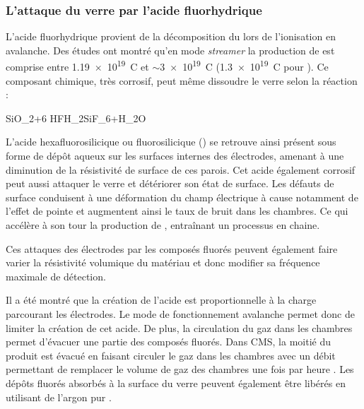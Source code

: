 \subsubsection{L'attaque du verre par l'acide fluorhydrique \texorpdfstring{}{HF}}
L'acide fluorhydrique  provient de la décomposition du  lors de l'ionisation en avalanche. Des études ont montré qu'en mode \textit{streamer} la production de  est comprise entre \num{1.19e19}\si{\per\coulomb} \cite{Lu:2009zzd} et $\sim$\num{3e19}\si{\per\coulomb} \cite{Abbrescia:2006hk} (\num{1.3e19}\si{\per\coulomb} pour \cite{Aielli:2006ih}). Ce composant chimique, très corrosif, peut même dissoudre le verre selon la réaction :
\begin{chemeqn}
SiO_2+6 HF\longrightarrow H_2SiF_6+H_2O
\end{chemeqn}
L'acide hexafluorosilicique ou fluorosilicique () se retrouve ainsi présent sous forme de dépôt aqueux sur les surfaces internes des électrodes, amenant à une diminution de la résistivité de surface de ces parois. Cet acide également corrosif peut aussi attaquer le verre et détériorer son état de surface. Les défauts de surface conduisent à une déformation du champ électrique à cause notamment de l'effet de pointe et augmentent ainsi le taux de bruit dans les chambres. Ce qui accélère à son tour la production de , entraînant un processus en chaine.

Ces attaques des électrodes par les composés fluorés peuvent également faire varier la résistivité volumique du matériau et donc modifier sa fréquence maximale de détection.

Il a été montré que la création de l'acide  est proportionnelle à la charge parcourant les électrodes. Le mode de fonctionnement avalanche permet donc de limiter la création de cet acide. De plus, la circulation du gaz dans les chambres permet d'évacuer une partie des composés fluorés. Dans CMS, la moitié du  produit est évacué en faisant circuler le gaz dans les chambres avec un débit permettant de remplacer le volume de gaz des chambres une fois par heure \cite{Abbrescia:2006hk}. Les dépôts fluorés absorbés à la surface du verre peuvent également être libérés en utilisant de l'argon pur \cite{Band:2008zza}.

